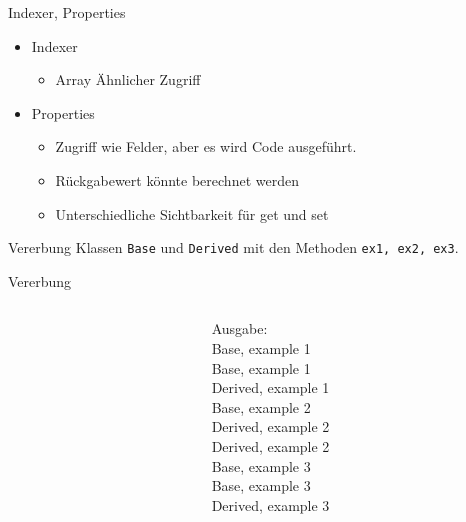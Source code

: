 \documentclass[11pt]{beamer}
\begin{document}
\begin{frame}{Indexer, Properties}
	\begin{itemize}
		\item Indexer
		\begin{itemize}
			\item Array Ähnlicher Zugriff
		\end{itemize}
		\item Properties 
		\begin{itemize}
			\item Zugriff wie Felder, aber es wird Code ausgeführt. 
			\item Rückgabewert könnte berechnet werden
			\item Unterschiedliche Sichtbarkeit für \glqq get\grqq{} und \glqq set\grqq
		\end{itemize}
	\end{itemize}
\end{frame}

\begin{frame}{Vererbung}
	Klassen \texttt{Base} und \texttt{Derived} mit den Methoden \texttt{ex1, ex2, ex3}.
\end{frame}

\begin{frame}{Vererbung}
	\begin{columns}
		\begin{column}{0.7\textwidth}
		\end{column}
		\begin{column}{0.3\textwidth}
		Ausgabe: \medskip\\
Base, example 1\\
Base, example 1\\
Derived, example 1 \medskip\\
Base, example 2\\
Derived, example 2\\
Derived, example 2\medskip\\
Base, example 3\\
Base, example 3\\
Derived, example 3			
		\end{column}
	\end{columns}
\end{frame}
\end{document}
